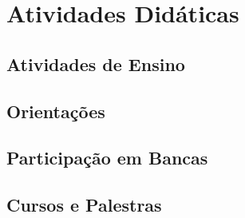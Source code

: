 \section{Atividades Didáticas}
\label{sec:didaticas}

\lipsum[18]

\subsection{Atividades de Ensino}
\label{subsec:ensino}

\lipsum[19-20]


\subsection{Orientações}
\label{subsec:orientacoes}  
 
\lipsum[21-22]

\subsection{Participação em Bancas}

\lipsum[23-24]

\subsection{Cursos e Palestras}
\label{subsec:cursos}  

\lipsum[25-27]
